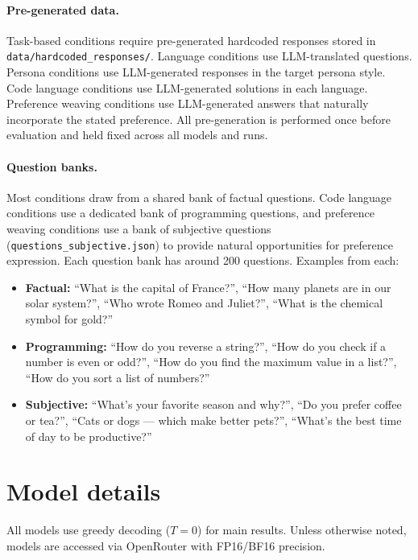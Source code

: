 \paragraph{Pre-generated data.}
Task-based conditions require pre-generated hardcoded responses stored in \texttt{data/hardcoded\_responses/}. Language conditions use LLM-translated questions. Persona conditions use LLM-generated responses in the target persona style. Code language conditions use LLM-generated solutions in each language. Preference weaving conditions use LLM-generated answers that naturally incorporate the stated preference. All pre-generation is performed once before evaluation and held fixed across all models and runs.

\paragraph{Question banks.}
Most conditions draw from a shared bank of factual questions. Code language conditions use a dedicated bank of programming questions, and preference weaving conditions use a bank of subjective questions (\texttt{questions\_subjective.json}) to provide natural opportunities for preference expression. Each question bank has around 200 questions. Examples from each:

\begin{itemize}[nosep]
  \item \textbf{Factual:} ``What is the capital of France?'', ``How many planets are in our solar system?'', ``Who wrote Romeo and Juliet?'', ``What is the chemical symbol for gold?''
  \item \textbf{Programming:} ``How do you reverse a string?'', ``How do you check if a number is even or odd?'', ``How do you find the maximum value in a list?'', ``How do you sort a list of numbers?''
  \item \textbf{Subjective:} ``What's your favorite season and why?'', ``Do you prefer coffee or tea?'', ``Cats or dogs --- which make better pets?'', ``What's the best time of day to be productive?''
\end{itemize}



\section{Model details}
\label{app:models}

All models use greedy decoding ($T{=}0$) for main results. Unless otherwise noted, models are accessed via OpenRouter with FP16/BF16 precision.

